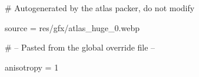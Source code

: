 # Autogenerated by the atlas packer, do not modify

source = res/gfx/atlas_huge_0.webp

# -- Pasted from the global override file --

anisotropy = 1
